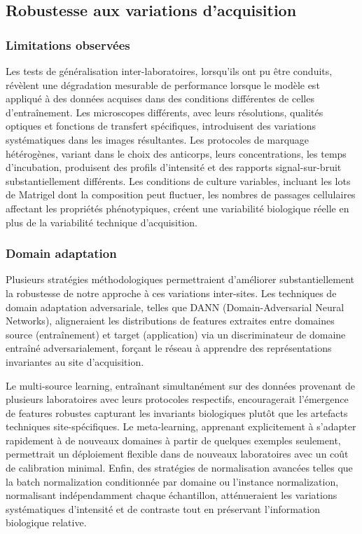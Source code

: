 \subsection{Robustesse aux variations d'acquisition}

\subsubsection{Limitations observées}

Les tests de généralisation inter-laboratoires, lorsqu'ils ont pu être conduits, révèlent une dégradation mesurable de performance lorsque le modèle est appliqué à des données acquises dans des conditions différentes de celles d'entraînement. Les microscopes différents, avec leurs résolutions, qualités optiques et fonctions de transfert spécifiques, introduisent des variations systématiques dans les images résultantes. Les protocoles de marquage hétérogènes, variant dans le choix des anticorps, leurs concentrations, les temps d'incubation, produisent des profils d'intensité et des rapports signal-sur-bruit substantiellement différents. Les conditions de culture variables, incluant les lots de Matrigel dont la composition peut fluctuer, les nombres de passages cellulaires affectant les propriétés phénotypiques, créent une variabilité biologique réelle en plus de la variabilité technique d'acquisition.

\subsubsection{Domain adaptation}

Plusieurs stratégies méthodologiques permettraient d'améliorer substantiellement la robustesse de notre approche à ces variations inter-sites. Les techniques de domain adaptation adversariale, telles que DANN (Domain-Adversarial Neural Networks), aligneraient les distributions de features extraites entre domaines source (entraînement) et target (application) via un discriminateur de domaine entraîné adversarialement, forçant le réseau à apprendre des représentations invariantes au site d'acquisition.

Le multi-source learning, entraînant simultanément sur des données provenant de plusieurs laboratoires avec leurs protocoles respectifs, encouragerait l'émergence de features robustes capturant les invariants biologiques plutôt que les artefacts techniques site-spécifiques. Le meta-learning, apprenant explicitement à s'adapter rapidement à de nouveaux domaines à partir de quelques exemples seulement, permettrait un déploiement flexible dans de nouveaux laboratoires avec un coût de calibration minimal. Enfin, des stratégies de normalisation avancées telles que la batch normalization conditionnée par domaine ou l'instance normalization, normalisant indépendamment chaque échantillon, atténueraient les variations systématiques d'intensité et de contraste tout en préservant l'information biologique relative.

